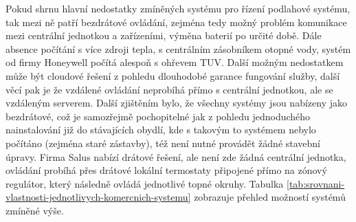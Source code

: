 Pokud shrnu hlavní nedostatky zmíněných systému pro řízení podlahové systému, tak mezi ně patří bezdrátové ovládání, zejména tedy možný problém komunikace mezi centrální jednotkou a zařízeními, výměna baterií po určité době. Dále absence počítání s více zdroji tepla, s centrálním zásobníkem otopné vody, systém od firmy Honeywell počítá alespoň s ohřevem TUV. Další možným nedostatkem může být cloudové řešení z pohledu dlouhodobé garance fungování služby, další věcí pak je že vzdálené ovládání neprobíhá přímo s centrální jednotkou, ale se vzdáleným serverem. Další zjištěním bylo, že všechny systémy jsou nabízeny jako bezdrátové, což je samozřejmě pochopitelné jak z pohledu jednoduchého nainstalování již do stávajících obydlí, kde s takovým to systémem nebylo počítáno (zejména staré zástavby), též není nutné provádět žádné stavební úpravy. Firma Salus nabízí drátové řešení, ale není zde žádná centrální jednotka, ovládání probíhá přes drátové lokální termostaty připojené přímo na zónový regulátor, který následně ovládá jednotlivé topné okruhy. Tabulka \ref{tab:srovnani-vlastnosti-jednotlivych-komercnich-systemu} zobrazuje přehled možností systémů zmíněné výše.


